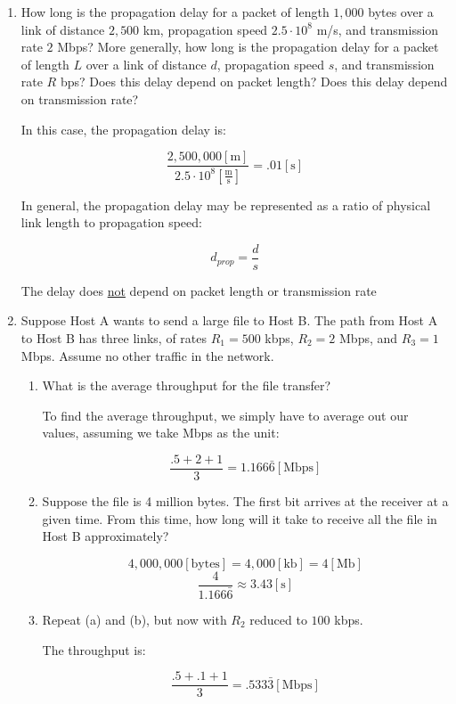 \begin{enumerate}
  \item How long is the propagation delay for a packet of length $1,000$ bytes over a link of distance $2,500$ km, propagation speed $2.5\cdot10^8$ m/s, and transmission rate $2$ Mbps? More generally, how long is the propagation delay for a packet of length $L$ over a link of distance $d$, propagation speed $s$, and transmission rate $R$ bps? Does this delay depend on packet length?  Does this delay depend on transmission rate?

    In this case, the propagation delay is:

    $$\frac{2,500,000[\si{\meter}]}{2.5\cdot10^{8}\left[ \frac{\si{\meter}}{\si{\second}} \right]}=.01[\si{\second}]$$

    In general, the propagation delay may be represented as a ratio of physical link length to propagation speed:

    $$d_{prop}=\frac{d}{s}$$

    The delay does \underline{not} depend on packet length or transmission rate

  \item Suppose Host A wants to send a large file to Host B. The path from Host A to Host B has three links, of rates $R_1=500$ kbps, $R_2=2$ Mbps, and $R_3=1$ Mbps. Assume no other traffic in the network.

    \begin{enumerate}

      \item What is the average throughput for the file transfer?

        To find the average throughput, we simply have to average out our values, assuming we take Mbps as the unit:

        $$\frac{.5 + 2 + 1}{3}=1.166\bar{6}[\text{Mbps}]$$

      \item Suppose the file is 4 million bytes. The first bit arrives at the receiver at a given time. From this time, how long will it take to receive all the file in Host B approximately?

        $$4,000,000[\text{bytes}]=4,000[\text{kb}]=4[\text{Mb}]$$
        $$\frac{4}{1.166\bar{6}}\approx3.43[\si{\second}]$$

      \item Repeat (a) and (b), but now with $R_2$ reduced to $100$ kbps.

        The throughput is:

        $$\frac{.5+.1+1}{3}=.533\bar{3}[\text{Mbps}]$$


\end{enumerate}
\end{enumerate}

